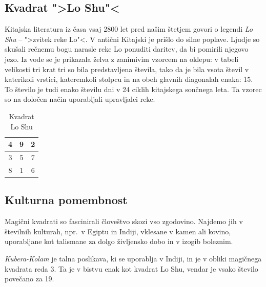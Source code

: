 \documentclass[a4paper,12pt]{article}
\begin{document}
\subsection{Kvadrat ">Lo Shu"<}

Kitajska literatura iz časa vsaj 2800 let pred našim štetjem govori o legendi
\emph{Lo Shu} -- ">zvitek reke Lo"<. V antični Kitajski je prišlo do
silne poplave. Ljudje so skušali rečnemu bogu narasle reke Lo ponuditi daritev,
da bi pomirili njegovo jezo. Iz vode se je prikazala želva z zanimivim vzorcem
na oklepu: v tabeli velikosti tri krat tri so bila predstavljena števila, tako
da je bila vsota števil v katerikoli vrstici, kateremkoli stolpcu in na obeh
glavnih diagonalah enaka: 15. To število je tudi enako številu dni v 24 ciklih
kitajskega sončnega leta. Ta vzorec so na določen način uporabljali upravljalci
reke.

\begin{table}[h!]
   \centering
   \caption{Kvadrat Lo Shu}
   \label{loshu}
   \begin{tabular}{|c|c|c|}
      \hline
      4 & 9 & 2 \\\hline
      3 & 5 & 7 \\\hline
      8 & 1 & 6 \\\hline
      \end{tabular}
\end{table}

\subsection{Kulturna pomembnost}

Magični kvadrati so fascinirali človeštvo skozi vso zgodovino. Najdemo jih
v številnih kulturah, npr.\ v Egiptu in Indiji, vklesane v kamen ali
kovino, uporabljane kot talismane za dolgo življensko dobo in v
izogib boleznim.

\emph{Kubera-Kolam} je talna poslikava, ki se uporablja v Indiji, in je v
obliki magičnega kvadrata reda 3. Ta je v bistvu enak kot kvadrat
Lo Shu, vendar je vsako število povečano za 19.
\end{document}
